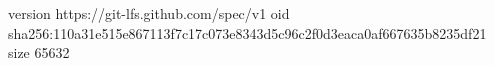 version https://git-lfs.github.com/spec/v1
oid sha256:110a31e515e867113f7c17c073e8343d5c96c2f0d3eaca0af667635b8235df21
size 65632
